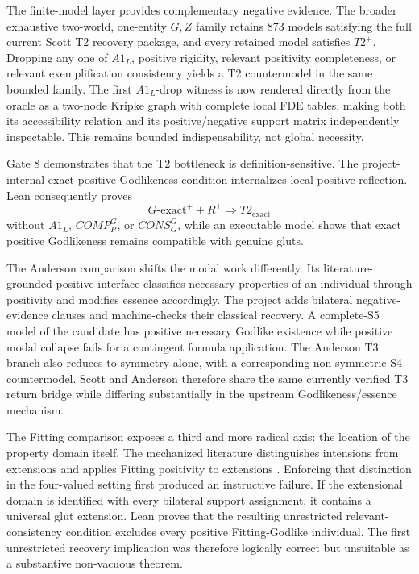 The finite-model layer provides complementary negative evidence. The broader exhaustive two-world, one-entity \(G,Z\) family retains 873 models satisfying the full current Scott T2 recovery package, and every retained model satisfies \(T2^+\). Dropping any one of \(A1_L\), positive rigidity, relevant positivity completeness, or relevant exemplification consistency yields a T2 countermodel in the same bounded family. The first \(A1_L\)-drop witness is now rendered directly from the oracle as a two-node Kripke graph with complete local FDE tables, making both its accessibility relation and its positive/negative support matrix independently inspectable. This remains bounded indispensability, not global necessity.

Gate 8 demonstrates that the T2 bottleneck is definition-sensitive. The project-internal exact positive Godlikeness condition internalizes local positive reflection. Lean consequently proves
\[
  G\text{-exact}^+ + R^+\Longrightarrow T2^+_{\mathrm{exact}}
\]
without \(A1_L\), \(COMP_P^G\), or \(CONS_G^G\), while an executable model shows that exact positive Godlikeness remains compatible with genuine gluts.

The Anderson comparison shifts the modal work differently. Its literature-grounded positive interface classifies necessary properties of an individual through positivity and modifies essence accordingly. The project adds bilateral negative-evidence clauses and machine-checks their classical recovery. A complete-S5 model of the candidate has positive necessary Godlike existence while positive modal collapse fails for a contingent formula application. The Anderson T3 branch also reduces to symmetry alone, with a corresponding non-symmetric S4 countermodel. Scott and Anderson therefore share the same currently verified T3 return bridge while differing substantially in the upstream Godlikeness/essence mechanism.

The Fitting comparison exposes a third and more radical axis: the location of the property domain itself. The mechanized literature distinguishes intensions from extensions and applies Fitting positivity to extensions \cite{BenzmuellerFuenmayor2019}. Enforcing that distinction in the four-valued setting first produced an instructive failure. If the extensional domain is identified with every bilateral support assignment, it contains a universal glut extension. Lean proves that the resulting unrestricted relevant-consistency condition excludes every positive Fitting-Godlike individual. The first unrestricted recovery implication was therefore logically correct but unsuitable as a substantive non-vacuous theorem.

